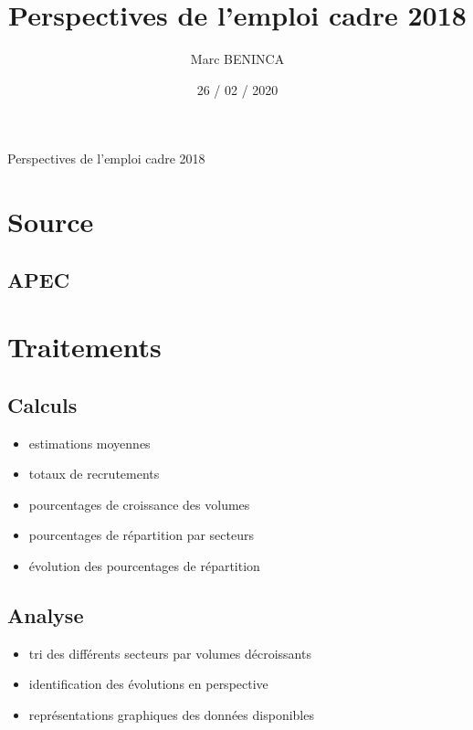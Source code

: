 \documentclass[20pt]{extarticle}
\begin{document}
\title{Perspectives de\newline
l’emploi cadre 2018}
\author{Marc BENINCA}
\date{26 / 02 / 2020}
\maketitle
\pagebreak
Perspectives de l’emploi cadre 2018
\renewcommand{\contentsname}{Sommaire}
\renewcommand{\cftsecleader}{\hfill}
\renewcommand{\cftsubsecleader}{\hfill}
\tableofcontents
\pagebreak
\section{Source}
\subsection{APEC}
\pagebreak
\section{Traitements}
\subsection{Calculs}
\begin{itemize}
\item{estimations moyennes}
\item{totaux de recrutements}
\item{pourcentages de croissance des volumes}
\item{pourcentages de répartition par secteurs}
\item{évolution des pourcentages de répartition}
\end{itemize}
\subsection{Analyse}
\begin{itemize}
\item{tri des différents secteurs par volumes décroissants}
\item{identification des évolutions en perspective}
\item{représentations graphiques des données disponibles}
\end{itemize}
\pagebreak
\end{document}
